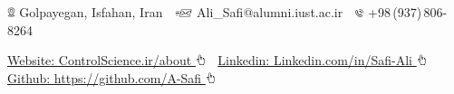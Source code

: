 \documentclass[letterpaper,MMMyyyy]{ResumeTemplate}
\newcommand{\CVAuthor}{Ali Safi}
\begin{document}
\centering
\Title{\CVAuthor} 
\begin{SubTitle}
{\includegraphics[height=8pt]{icons/locations.png} Golpayegan, Isfahan, Iran}
\,\SubBulletSymbol\,
{\includegraphics[height=7pt]{icons/SendEmail.png} Ali\_Safi@alumni.iust.ac.ir}
\,\SubBulletSymbol\,
\includegraphics[height=7pt]{icons/phone1.png}  +98\,(937)\,806-8264
\par
\href{https://www.controlscience.ir/about}{Website: ControlScience.ir/about \includegraphics[height=9pt]{icons/hand-cursor.png}} 
\,\SubBulletSymbol\,
\href{https://www.linkedin.com/in/safi-ali}{Linkedin: Linkedin.com/in/Safi-Ali \includegraphics[height=9pt]{icons/hand-cursor.png}} 
\,\SubBulletSymbol\,
\href{https://github.com/A-Safi}{Github: https://github.com/A-Safi \includegraphics[height=9pt]{icons/hand-cursor.png}} 
\end{SubTitle}
\end{document}
